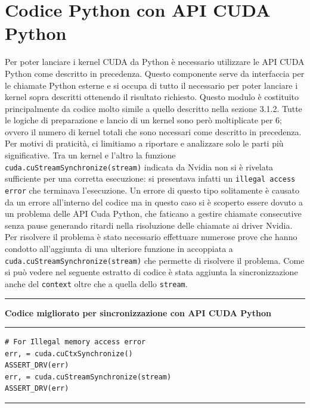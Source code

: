 \documentclass[12pt,a4paper]{report}
\begin{document}
{\section{Codice Python con API CUDA Python}
Per poter lanciare i kernel CUDA da Python è necessario utilizzare le API CUDA Python come descritto in precedenza. \newline
Questo componente serve da interfaccia per le chiamate Python esterne e si occupa di tutto il necessario per poter lanciare i kernel sopra descritti ottenendo il risultato richiesto. \newline
Questo modulo è costituito principalmente da codice molto simile a quello descritto nella sezione 3.1.2. Tutte le logiche di preparazione e lancio di un kernel sono però moltiplicate per 6; ovvero il numero di kernel totali che sono necessari come descritto in precedenza. \newline
Per motivi di praticità, ci limitiamo a riportare e analizzare solo le parti più significative. \newline \newline
Tra un kernel e l'altro la funzione \verb|cuda.cuStreamSynchronize(stream)| indicata da Nvidia non si è rivelata sufficiente per una corretta esecuzione: si presentava infatti un \verb|illegal access error| che terminava l'esecuzione. Un errore di questo tipo solitamente è causato da un errore all'interno del codice ma in questo caso si è scoperto essere dovuto a un problema delle API Cuda Python, che faticano a gestire chiamate consecutive senza pause generando ritardi nella risoluzione delle chiamate ai driver Nvidia.
Per risolvere il problema è stato necessario effettuare numerose prove che hanno condotto all'aggiunta di una ulteriore funzione in accoppiata a \verb|cuda.cuStreamSynchronize(stream)| che permette di risolvere il problema. Come si può vedere nel seguente estratto di codice è stata aggiunta la sincronizzazione anche del \verb|context| oltre che a quella dello \verb|stream|. \\[10pt]
\noindent\rule[0.5ex]{\linewidth}{2pt}
\small{\textbf{Codice migliorato per sincronizzazione con API CUDA Python}} \\
\noindent\rule[0.5ex]{\linewidth}{1pt}
\begin{lstlisting}
# For Illegal memory access error
err, = cuda.cuCtxSynchronize()
ASSERT_DRV(err)
err, = cuda.cuStreamSynchronize(stream)
ASSERT_DRV(err)
\end{lstlisting}
\noindent\rule[0.5ex]{\linewidth}{1pt} \\[10pt]

}
\end{document}
